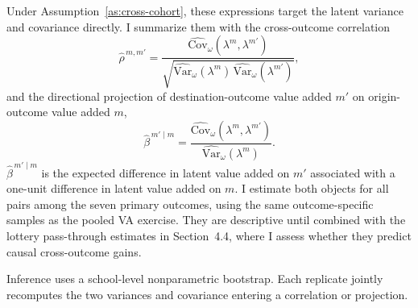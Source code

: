 \documentclass[a4paper, article, english, oneside, unknownkeysallowed, 12pt]{memoir}
\begin{document}
Under Assumption~\ref{as:cross-cohort}, these expressions target the latent variance and
covariance directly. I summarize them with the cross-outcome correlation
\begin{equation}
  \widehat\rho^{\,m,m'} = \frac{\widehat{\mathrm{Cov}}_{\omega}\left(\lambda^m,\lambda^{m'}\right)}{\sqrt{\widehat{\mathrm{Var}}_{\omega}(\lambda^m)\,\widehat{\mathrm{Var}}_{\omega}(\lambda^{m'})}},
  \label{eq:varcov-correlation}
\end{equation}
and the directional projection of destination-outcome value added $m'$ on origin-outcome
value added $m$,
\begin{equation}
  \widehat\beta^{\,m' \mid m} = \frac{\widehat{\mathrm{Cov}}_{\omega}\left(\lambda^m,\lambda^{m'}\right)}{\widehat{\mathrm{Var}}_{\omega}(\lambda^m)}.
  \label{eq:varcov-implied-gain}
\end{equation}
$\widehat\beta^{\,m'\mid m}$ is the expected difference in latent value added on $m'$ associated
with a one-unit difference in latent value added on $m$. I estimate both objects for all
pairs among the seven primary outcomes, using the same outcome-specific samples as the
pooled VA exercise. They are descriptive until combined with the lottery pass-through
estimates in Section~4.4, where I assess whether they predict causal cross-outcome gains.

Inference uses a school-level nonparametric bootstrap. Each replicate jointly recomputes
the two variances and covariance entering a correlation or projection.

\clearpage





\end{document}
